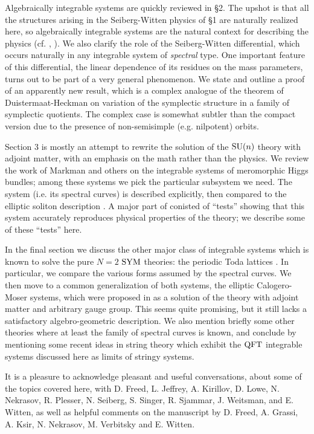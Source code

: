 Algebraically integrable systems are quickly reviewed in
\S2.
The upshot is that all the structures arising in the
Seiberg-Witten physics of \S1 are naturally realized here,
so algebraically integrable systems are the natural context
for describing the physics (cf. \cite{DW}, \cite{F}).
We also clarify the role of the Seiberg-Witten differential,
which occurs naturally in any integrable system of
{\it spectral} type.
One important feature of this differential, the linear
dependence of its residues on the mass parameters, turns out
to be part of a very general phenomenon.
We state and outline a proof of an apparently new result,
which is a complex analogue of the theorem of
Duistermaat-Heckman \cite{DH} on variation of the symplectic
structure in a family of symplectic quotients.
The complex case is somewhat subtler than the compact
version due to the presence of non-semisimple (e.g.
nilpotent) orbits.

Section 3 is mostly an attempt to rewrite the solution
\cite{DW} of the $\text{\rm SU}(n)$ theory with adjoint matter, with an
emphasis on the math rather than the physics.
We review the work of Markman \cite{Mn} and others on the
integrable systems of meromorphic Higgs bundles; among
these systems we pick the particular subsystem we need.
The system (i.e. its spectral curves) is described
explicitly, then compared to the elliptic soliton
description \cite{T, TV}.
A major part of \cite{DW} conisted of ``tests'' showing that
this system accurately reproduces physical properties of the
theory; we describe some of these ``tests'' here.

In the final section we discuss the other major class of
integrable systems which is known to solve the pure $N=2 $  
$\text{\rm SYM}$ theories: the periodic Toda lattices \cite{MW1}.
In particular, we compare the various forms assumed by the
spectral curves.
We then move to a common generalization of both systems,
the elliptic Calogero-Moser systems, which were
proposed in
\cite{Mc} as a solution of the theory with adjoint matter and
arbitrary gauge group.
This seems quite promising, but it still lacks a satisfactory
algebro-geometric description.
We also mention briefly some other theories where at least
the family of spectral curves is known, and conclude by
mentioning some recent ideas in string theory which exhibit
the $\text{\rm QFT}$ integrable systems discussed here as limits of
stringy systems.

It is a pleasure to acknowledge pleasant and useful
conversations, about some of the topics covered here, with
D. Freed, L. Jeffrey, A. Kirillov, D. Lowe, N. Nekrasov, R.
Plesser, N. Seiberg, S. Singer, R. Sjammar, J. Weitsman, and
E. Witten, as well as helpful comments on the manuscript by 
D. Freed, A. Grassi, A. Ksir, N. Nekrasov, M. Verbitsky 
and E. Witten.


